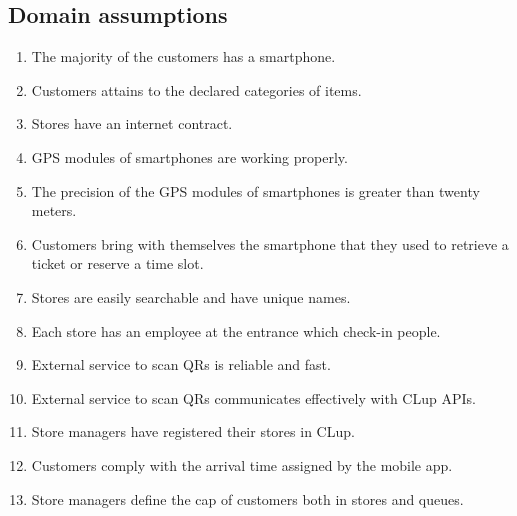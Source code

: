 \subsection{Domain assumptions}
\begin{enumerate}[label=\textbf{D.\arabic*}]
	\item The majority of the customers has a smartphone.
	\item Customers attains to the declared categories of items.
	\item Stores have an internet contract.
	\item GPS modules of smartphones are working properly.
	\item The precision of the GPS  modules of smartphones is greater than twenty meters.
	\item Customers bring with themselves the smartphone that they used to retrieve a ticket or reserve a time slot.
	\item Stores are easily searchable and have unique names.
	\item Each store has an employee at the entrance which check-in people.
	\item External service to scan QRs is reliable and fast.
	\item External service to scan QRs communicates effectively with CLup APIs.
	\item Store managers have registered their stores in CLup.
	\item Customers comply with the arrival time assigned by the mobile app.
	\item Store managers define the cap of customers both in stores and queues.
\end{enumerate}
